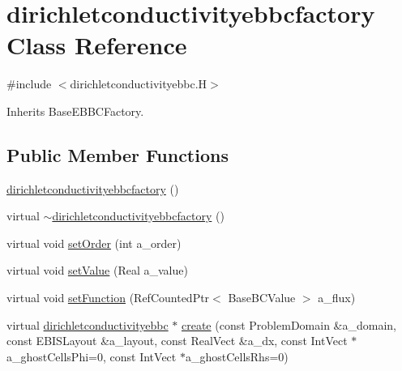 \hypertarget{classdirichletconductivityebbcfactory}{}\section{dirichletconductivityebbcfactory Class Reference}
\label{classdirichletconductivityebbcfactory}


{\ttfamily \#include $<$dirichletconductivityebbc.\+H$>$}



Inherits Base\+E\+B\+B\+C\+Factory.

\subsection*{Public Member Functions}
\begin{DoxyCompactItemize}
\item 
\hyperlink{classdirichletconductivityebbcfactory_a69b7543427f7f3e3b886574949c4d59c}{dirichletconductivityebbcfactory} ()
\item 
virtual \hyperlink{classdirichletconductivityebbcfactory_a915c84435479200e80e561857544fd4c}{$\sim$dirichletconductivityebbcfactory} ()
\item 
virtual void \hyperlink{classdirichletconductivityebbcfactory_a2be3d500151bf47f9adac772bad2be7d}{set\+Order} (int a\+\_\+order)
\item 
virtual void \hyperlink{classdirichletconductivityebbcfactory_a7393fad003901865e61baba4fbfdc86f}{set\+Value} (Real a\+\_\+value)
\item 
virtual void \hyperlink{classdirichletconductivityebbcfactory_a8a1453760efd621d91eea1957022d584}{set\+Function} (Ref\+Counted\+Ptr$<$ Base\+B\+C\+Value $>$ a\+\_\+flux)
\item 
virtual \hyperlink{classdirichletconductivityebbc}{dirichletconductivityebbc} $\ast$ \hyperlink{classdirichletconductivityebbcfactory_af31a0a8910c072749faf7d4f8216a15c}{create} (const Problem\+Domain \&a\+\_\+domain, const E\+B\+I\+S\+Layout \&a\+\_\+layout, const Real\+Vect \&a\+\_\+dx, const Int\+Vect $\ast$a\+\_\+ghost\+Cells\+Phi=0, const Int\+Vect $\ast$a\+\_\+ghost\+Cells\+Rhs=0)
\end{DoxyCompactItemize}
